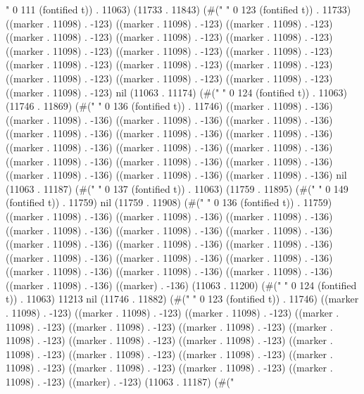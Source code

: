 {                                                                          " 0 111 (fontified t)) . 11063) (11733 . 11843) (#("                                                                                                                           " 0 123 (fontified t)) . 11733) ((marker . 11098) . -123) ((marker . 11098) . -123) ((marker . 11098) . -123) ((marker . 11098) . -123) ((marker . 11098) . -123) ((marker . 11098) . -123) ((marker . 11098) . -123) ((marker . 11098) . -123) ((marker . 11098) . -123) ((marker . 11098) . -123) ((marker . 11098) . -123) ((marker . 11098) . -123) ((marker . 11098) . -123) ((marker . 11098) . -123) ((marker . 11098) . -123) ((marker . 11098) . -123) nil (11063 . 11174) (#("                                                                                                                            " 0 124 (fontified t)) . 11063) (11746 . 11869) (#("                                                                                                                                        " 0 136 (fontified t)) . 11746) ((marker . 11098) . -136) ((marker . 11098) . -136) ((marker . 11098) . -136) ((marker . 11098) . -136) ((marker . 11098) . -136) ((marker . 11098) . -136) ((marker . 11098) . -136) ((marker . 11098) . -136) ((marker . 11098) . -136) ((marker . 11098) . -136) ((marker . 11098) . -136) ((marker . 11098) . -136) ((marker . 11098) . -136) ((marker . 11098) . -136) ((marker . 11098) . -136) ((marker . 11098) . -136) nil (11063 . 11187) (#("                                                                                                                                         " 0 137 (fontified t)) . 11063) (11759 . 11895) (#("                                                                                                                                                     " 0 149 (fontified t)) . 11759) nil (11759 . 11908) (#("                                                                                                                                        " 0 136 (fontified t)) . 11759) ((marker . 11098) . -136) ((marker . 11098) . -136) ((marker . 11098) . -136) ((marker . 11098) . -136) ((marker . 11098) . -136) ((marker . 11098) . -136) ((marker . 11098) . -136) ((marker . 11098) . -136) ((marker . 11098) . -136) ((marker . 11098) . -136) ((marker . 11098) . -136) ((marker . 11098) . -136) ((marker . 11098) . -136) ((marker . 11098) . -136) ((marker . 11098) . -136) ((marker . 11098) . -136) ((marker) . -136) (11063 . 11200) (#("                                                                                                                            " 0 124 (fontified t)) . 11063) 11213 nil (11746 . 11882) (#("                                                                                                                           " 0 123 (fontified t)) . 11746) ((marker . 11098) . -123) ((marker . 11098) . -123) ((marker . 11098) . -123) ((marker . 11098) . -123) ((marker . 11098) . -123) ((marker . 11098) . -123) ((marker . 11098) . -123) ((marker . 11098) . -123) ((marker . 11098) . -123) ((marker . 11098) . -123) ((marker . 11098) . -123) ((marker . 11098) . -123) ((marker . 11098) . -123) ((marker . 11098) . -123) ((marker . 11098) . -123) ((marker . 11098) . -123) ((marker) . -123) (11063 . 11187) (#("                   }
